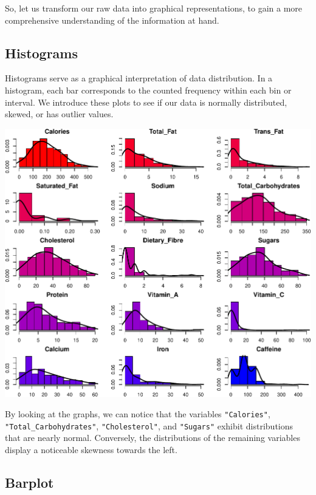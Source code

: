 \documentclass[
]{article}
\begin{document}
So, let us transform our raw data into graphical representations, to
gain a more comprehensive understanding of the information at hand.

\subsection{Histograms}\label{histograms}

Histograms serve as a graphical interpretation of data distribution. In
a histogram, each bar corresponds to the counted frequency within each
bin or interval. We introduce these plots to see if our data is normally
distributed, skewed, or has outlier values.

\begin{center}\includegraphics{Statistical_Learning_Final_Report_files/figure-latex/histograms-1} \end{center}

By looking at the graphs, we can notice that the variables
\texttt{"Calories"}, \texttt{"Total\_Carbohydrates"},
\texttt{"Cholesterol"}, and \texttt{"Sugars"} exhibit distributions that
are nearly normal. Conversely, the distributions of the remaining
variables display a noticeable skewness towards the left.

\subsection{Barplot}\label{barplot}
\end{document}
